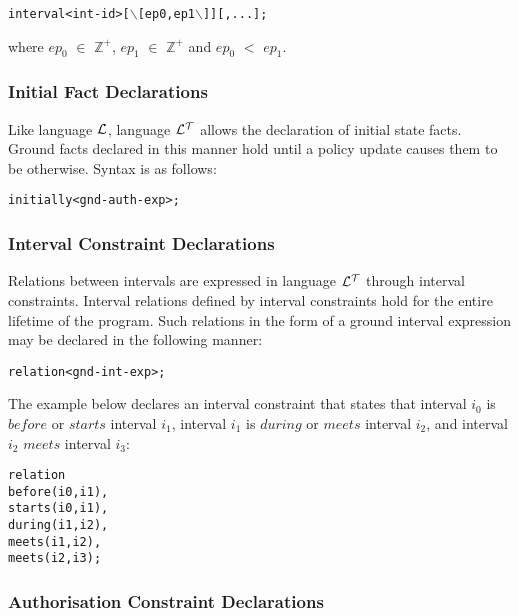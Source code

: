 \documentclass[11pt]{report}
\newenvironment{vverbatim}
{
  \begin{alltt}
}
{
  \vspace{-\baselineskip}
  \end{alltt}
}
\begin{document}
          \begin{vverbatim}
  interval <int-id> [\(\backslash\)[ep0, ep1\(\backslash\)]][, ... ];
          \end{vverbatim}

          \noindent
          where $ep_0$ $\in$ ${\mathbb Z}^+$, $ep_1$ $\in$ ${\mathbb Z}^+$ and
          $ep_0$ $<$ $ep_1$.

        \subsubsection{Initial Fact Declarations}

          Like language ${\cal L}$, language ${\cal L^T}$ allows the
          declaration of initial state facts. Ground facts declared in this
          manner hold until a policy update causes them to be otherwise. Syntax
          is as follows:

          \begin{vverbatim}
  initially <gnd-auth-exp>;
          \end{vverbatim}

        \subsubsection{Interval Constraint Declarations}

          Relations between intervals are expressed in language ${\cal L^T}$
          through interval constraints. Interval relations defined by interval
          constraints hold for the entire lifetime of the program. Such
          relations in the form of a ground interval expression may be declared
          in the following manner:

          \begin{vverbatim}
  relation <gnd-int-exp>;
          \end{vverbatim}

          The example below declares an interval constraint that states that
          interval $i_0$ is $before$ or $starts$ interval $i_1$, interval $i_1$
          is $during$ or $meets$ interval $i_2$, and interval $i_2$ $meets$
          interval $i_3$:

          \begin{vverbatim}
  relation
    before(i0, i1),
    starts(i0, i1),
    during(i1, i2),
    meets(i1, i2),
    meets(i2, i3);
          \end{vverbatim}

        \subsubsection{Authorisation Constraint Declarations}
\end{document}
